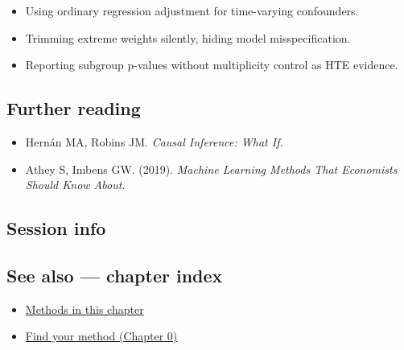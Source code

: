 \documentclass[
]{article}
\newenvironment{Shaded}{\begin{snugshade}}{\end{snugshade}}
\providecommand{\tightlist}{%
  \setlength{\itemsep}{0pt}\setlength{\parskip}{0pt}}
\begin{document}
\begin{itemize}
\tightlist
\item
  Using ordinary regression adjustment for time-varying confounders.
\item
  Trimming extreme weights silently, hiding model misspecification.
\item
  Reporting subgroup p-values without multiplicity control as HTE
  evidence.
\end{itemize}

\subsection{Further reading}\label{further-reading}

\begin{itemize}
\tightlist
\item
  Hernán MA, Robins JM. \emph{Causal Inference: What If.}
\item
  Athey S, Imbens GW. (2019). \emph{Machine Learning Methods That
  Economists Should Know About.}
\end{itemize}

\subsection{Session info}\label{session-info}

\begin{Shaded}
\begin{Highlighting}[]

\end{Highlighting}
\end{Shaded}

\subsection{See also --- chapter index}\label{see-also-chapter-index}

\begin{itemize}
\tightlist
\item
  \href{../index.Rmd}{Methods in this chapter}
\item
  \href{../../../ch00-find-your-method.Rmd}{Find your method (Chapter
  0)}
\end{itemize}
\end{document}
